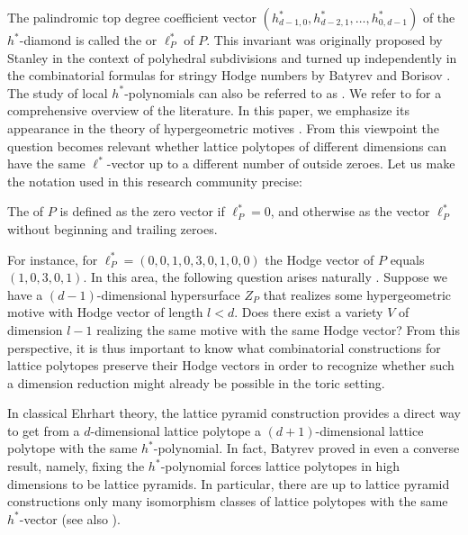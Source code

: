 \documentclass[reqno, 11pt, a4paper, oneside]{amsart}
\begin{document}
 The palindromic top degree coefficient vector  $(h^*_{d-1,0}, h^*_{d-2,1}, \ldots, h^*_{0,d-1})$ of the\linebreak $h^*$-diamond is called the  or  $\ell^*_P$ of $P$. This invariant was originally proposed by Stanley \cite{stanley_subdivisions_1992} in the context of polyhedral subdivisions and turned up independently in the combinatorial formulas for stringy Hodge numbers by Batyrev and Borisov \cite{batyrev_mirror_1996, batyrev_combinatorial_2008, nill_combinatorial_2012}. The study of local $h^*$-polynomials can also be referred to as . We refer to \cite{borger_thin_2023} for a comprehensive overview of the literature. In this paper, we emphasize its appearance in the theory of hypergeometric motives \cite{roberts_hypergeometric_2022}. From this viewpoint the question becomes relevant whether lattice polytopes of different dimensions can have the same $\ell^*$-vector up to a different number of outside zeroes. Let us make the notation used in this research community precise:

 \begin{dfn}
The  of $P$ is defined as the zero vector if $\ell^*_P=0$, and otherwise as the vector $\ell^*_P$ without beginning and trailing zeroes.
 \end{dfn}
 
For instance, for $\ell^*_P=(0,0,1,0,3,0,1,0,0)$ the Hodge vector of $P$ equals\linebreak $(1,0,3,0,1)$. In this area, the following question arises naturally \cite{roberts_hypergeometric_2022, GGFernando}. Suppose we have a $(d-1)$-dimensional hypersurface $Z_P$ that realizes some hypergeometric motive with Hodge vector of length $l<d$. Does there exist a variety $V$ of dimension $l-1$ realizing the same motive with the same Hodge vector? From this perspective, it is thus important to know what combinatorial constructions for lattice polytopes preserve their Hodge vectors in order to recognize whether such a dimension reduction might already be possible in the toric setting. 

\smallskip

In classical Ehrhart theory, the lattice pyramid construction provides a direct way to get from a $d$-dimensional lattice polytope a $(d+1)$-dimensional lattice polytope with the same $h^*$-polynomial. In fact, Batyrev proved in \cite{Batyrev-given} even a converse result, namely, fixing the $h^*$-polynomial forces lattice polytopes in high dimensions to be lattice pyramids. In particular, there are up to lattice pyramid constructions only  many isomorphism classes of lattice polytopes with the same $h^*$-vector (see also \cite{Nill-given}).
\end{document}
